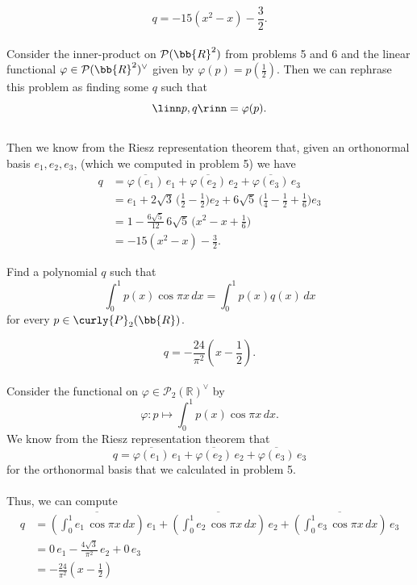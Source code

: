 \documentclass[12pt, letterpaper]{hmcpset}
\begin{document}
\begin{solution}
	\[
		\boxed{
			q = -15 (x^2 - x) - \frac{3}{2}.
		}
	\] \\
	Consider the inner-product on $\mathcal{P}(\bb{R}^2)$ from problems 5 and 6 and the linear functional $\varphi \in \mathcal{P}(\bb{R}^2)^\vee$ given by $\varphi(p) = p(\frac{1}{2})$. Then we can rephrase this problem as finding some $q$ such that
	\[
		\linn p, q \rinn = \varphi(p).
	\]\\
	Then we know from the Riesz representation theorem that, given an orthonormal basis $e_1, e_2, e_3$, (which we computed in problem 5) we have
	\[
		\begin{split}
			q & = \overline{\varphi(e_1)} \, e_1 + \overline{\varphi(e_2)} \, e_2 + \overline{\varphi(e_3)} \, e_3 \\
			  & = e_1 + 2 \sqrt 3 \, \Big ( \frac{1}{2} - \frac{1}{2} \Big ) e_2 + 6 \sqrt 5 \, \Big ( \frac{1}{4} - \frac{1}{2} + \frac{1} {6}  \Big ) e_3 \\
			  & = 1 - \frac{6 \sqrt 5}{12} \, 6 \sqrt 5 \, \Big ( x^2 - x + \frac{1}{6} \Big ) \\
			  & = -15 (x^2 - x) - \frac{3}{2}.
		\end{split}
	\]
	
\end{solution}

\pagebreak

\begin{problem}[8]
	Find a polynomial $q$ such that
	\[
		\int_0^1 p(x) \cos{\pi x} \, dx = \int_0^1 p(x) q(x) \, dx
	\]
	for every $p \in \curly{P}_2(\bb{R})$.
\end{problem}

\begin{solution}
	\[
		\boxed{
			q = - \frac{24}{\pi^2} \left ( x - \frac{1}{2} \right ).
		}
	\] \\
	Consider the functional on $\varphi \in \mathcal P_2(\mathbb R)^\vee$ by
	\[
		\varphi : p \mapsto \int_0^1 p(x) \cos{\pi x} \, dx.
	\]
	We know from the Riesz representation theorem that
	\[
		q = \overline{\varphi(e_1)} \, e_1 + \overline{\varphi(e_2)} \, e_2 + \overline{\varphi(e_3)} \, e_3
	\]
	for the orthonormal basis that we calculated in problem 5. \\\\
	Thus, we can compute
	\[
		\begin{split}
			q & = \overline{ \left ( \int_0^1 e_1 \, \cos{\pi x} \, dx \right )} \, e_1 + \overline{\left ( \int_0^1 e_2 \, \cos{\pi x} \, dx \right )} \, e_2 + \overline{\left ( \int_0^1 e_3 \, \cos{\pi x} \, dx \right )} \, e_3 \\
			  & = 0 \, e_1 - \frac{4 \sqrt 3}{\pi^2} \, e_2 + 0 \, e_3 \\
			  & = - \frac{24}{\pi^2} \left ( x - \frac{1}{2} \right )
		\end{split}
	\]
\end{solution}
\end{document}
